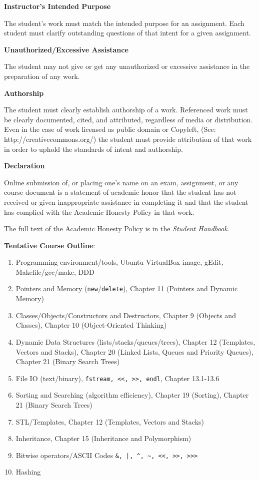\documentclass[11pt]{article}
\begin{document}
\textbf{Instructor's Intended Purpose}

\hspace{3mm} \hangindent=5mm The student's work must match the
intended purpose for an assignment. Each student must clarify
outstanding questions of that intent for a given assignment.

\textbf{Unauthorized/Excessive Assistance}

\hspace{3mm} \hangindent=5mm The student may not give or get any
unauthorized or excessive assistance in the preparation of any work.

\textbf{Authorship}

\hspace{3mm} \hangindent=5mm The student must clearly establish
authorship of a work. Referenced work must be clearly documented,
cited, and attributed, regardless of media or distribution. Even in
the case of work licensed as public domain or Copyleft, (See:
http://creativecommons.org/) the student must provide attribution of
that work in order to uphold the standards of intent and authorship.

\textbf{Declaration}

\hspace{3mm} \hangindent=5mm Online submission of, or placing one's
name on an exam, assignment, or any course document is a statement of
academic honor that the student has not received or given
inappropriate assistance in completing it and that the student has
complied with the Academic Honesty Policy in that work.

The full text of the Academic Honesty Policy is in the \emph{Student Handbook}.

\textbf {\large Tentative Course Outline}:

\begin{enumerate}
\item Programming environment/tools, Ubuntu VirtualBox image, gEdit, Makefile/gcc/make, DDD
\item Pointers and Memory (\lstinline$new$/\lstinline$delete$),
  Chapter 11 (Pointers and Dynamic Memory)
\item Classes/Objects/Constructors and Destructors, Chapter 9 (Objects
  and Classes), Chapter 10 (Object-Oriented Thinking)
\item Dynamic Data Structures (lists/stacks/queues/trees), Chapter 12
  (Templates, Vectors and Stacks), Chapter 20 (Linked Lists, Queues
  and Priority Queues), Chapter 21 (Binary Search Trees)
\item File IO (text/binary), \lstinline$fstream, <<, >>, endl$, Chapter 13.1-13.6
\item Sorting and Searching (algorithm efficiency), Chapter 19
  (Sorting), Chapter 21 (Binary Search Trees)
\item STL/Templates, Chapter 12 (Templates, Vectors and Stacks)
\item Inheritance, Chapter 15 (Inheritance and Polymorphism)
\item Bitwise operators/ASCII Codes \lstinline$&, |, ^, ~, <<, >>, >>>$
\item Hashing
\end{enumerate}
\end{document}
